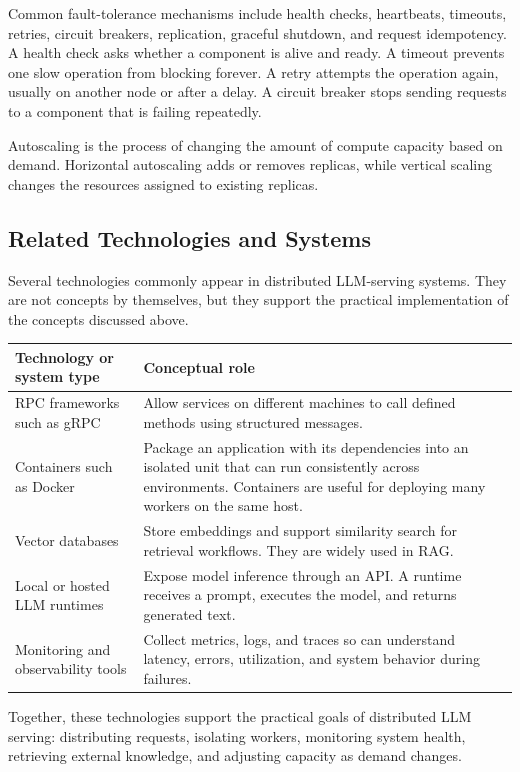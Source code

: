 Common fault-tolerance mechanisms include health checks, heartbeats, timeouts, retries, circuit breakers, replication, graceful shutdown, and request idempotency. A health check asks whether a component is alive and ready. A timeout prevents one slow operation from blocking forever. A retry attempts the operation again, usually on another node or after a delay. A circuit breaker stops sending requests to a component that is failing repeatedly.

Autoscaling is the process of changing the amount of compute capacity based on demand. Horizontal autoscaling adds or removes replicas, while vertical scaling changes the resources assigned to existing replicas.

\subsection{Related Technologies and Systems}
Several technologies commonly appear in distributed LLM-serving systems. They are not concepts by themselves, but they support the practical implementation of the concepts discussed above.

\begin{table}[H]
  \centering
  \renewcommand{\arraystretch}{1.2}
  \begin{tabularx}{\textwidth}{@{}lX@{}}
    \toprule
    \textbf{Technology or system type} & \textbf{Conceptual role} \\
    \midrule
    RPC frameworks such as gRPC & Allow services on different machines to call defined methods using structured messages. \\
    Containers such as Docker & Package an application with its dependencies into an isolated unit that can run consistently across environments. Containers are useful for deploying many workers on the same host. \\
    Vector databases & Store embeddings and support similarity search for retrieval workflows. They are widely used in RAG. \\
    Local or hosted LLM runtimes & Expose model inference through an API. A runtime receives a prompt, executes the model, and returns generated text. \\
    Monitoring and observability tools & Collect metrics, logs, and traces so can understand latency, errors, utilization, and system behavior during failures. \\
    \bottomrule
  \end{tabularx}
\end{table}

Together, these technologies support the practical goals of distributed LLM serving: distributing requests, isolating workers, monitoring system health, retrieving external knowledge, and adjusting capacity as demand changes.
